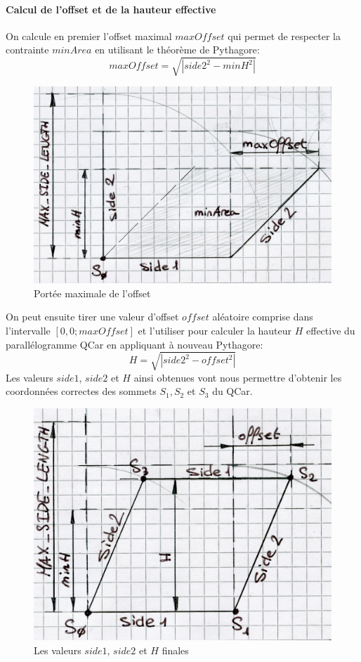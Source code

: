 \documentclass[a4paper, 12pt]{article}
\begin{document}
\paragraph{Calcul de l'offset et de la hauteur effective}
On calcule en premier l'offset maximal $maxOffset$ qui permet de respecter la contrainte $minArea$ en utilisant le théorème de Pythagore:
\[ maxOffset =\sqrt{\left|\mathit{side2}^{2}-minH^{2}\right|} \]
\begin{figure}[h!]
 \centering
 \includegraphics[width=0.5\linewidth]{includes/images/creaQCar3}
 \caption{Portée maximale de l'offset}
 \label{fig:creaqcar3}
\end{figure}
On peut ensuite tirer une valeur d'offset $offset$ aléatoire comprise dans l'intervalle $[0,0;maxOffset]$ et l'utiliser pour calculer la hauteur $H$ effective du parallélogramme QCar en appliquant à nouveau Pythagore:
\[ H =\sqrt{\left|\mathit{side2}^{2}-offset^{2}\right|} \]
Les valeurs $\mathit{side1}$, $\mathit{side2}$ et $H$ ainsi obtenues vont nous permettre d'obtenir les coordonnées correctes des sommets $S_{1}, S_{2}$ et $S_{3}$ du QCar.
\begin{figure}[h!]
 \centering
 \includegraphics[width=0.4\linewidth]{includes/images/creaQCar4}
 \caption{Les valeurs $\mathit{side1}$, $\mathit{side2}$ et $H$ finales}
 \label{fig:creaqcar4}
\end{figure}
\end{document}
